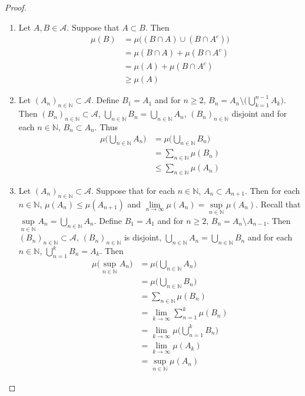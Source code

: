 \documentclass[12pt]{amsart}
\newcommand{\N}{\mathbb{N}}
\newcommand{\MA}{\mathcal{A}}
\begin{document}
\begin{proof}\
\begin{enumerate}
\item Let $A, B \in \MA$. Suppose that $A \subset B$. Then 
\begin{align*}
\mu(B) 
&= \mu\bigg((B \cap A) \cup (B \cap A^c)\bigg)\\
&= \mu(B \cap A) + \mu(B \cap A^c)\\
&= \mu(A) + \mu(B \cap A^c)\\
&\geq \mu(A)
\end{align*}
\item Let $(A_n)_{n \in \N} \subset \MA$. Define $B_1 = A_1$ and for $n \geq 2$, $B_n = A_n \setminus \bigg( \bigcup\limits_{k=1}^{n-1}A_k \bigg)$. Then $(B_n)_{n \in \N} \subset \MA$, $\bigcup\limits_{n \in \N}B_n = \bigcup\limits_{n \in \N}A_n $, $(B_n)_{n \in \N}$ disjoint and for each $n \in \N$, $B_n \subset A_n$. Thus 
\begin{align*}
\mu\bigg(\bigcup_{n \in \N}A_n \bigg)
&= \mu\bigg(\bigcup_{n \in \N}B_n \bigg)\\
&= \sum_{n \in \N}\mu(B_n) \\
&\leq \sum_{n \in \N}\mu(A_n)
\end{align*} 
\item Let $(A_n)_{n \in \N} \subset \MA$. Suppose that for each $n \in \N$, $A_n \subset A_{n+1}$. Then for each $n \in \N$, $\mu(A_n) \leq \mu(A_{n+1})$ and $\lim\limits_{n \rightarrow \infty}\mu(A_n) = \sup\limits_{n \in \N} \mu(A_n)$. Recall that $\sup\limits_{n \in \N}A_n = \bigcup\limits_{n \in \N}A_n$. 
Define $B_1 = A_1$ and for $n \geq 2$, $B_n = A_n \setminus A_{n-1}$. Then $(B_n)_{n \in \N} \subset \MA$, $(B_n)_{n \in \N}$ is disjoint, $\bigcup\limits_{n \in \N}A_n = \bigcup\limits_{n \in \N}B_n$ and for each $n \in \N$, $\bigcup\limits_{n=1}^{k}B_n = A_k$. Then 
\begin{align*}
\mu\bigg(\sup_{n \in \N}A_n \bigg)
&= \mu\bigg(\bigcup_{n \in \N}A_n \bigg) \\
&= \mu\bigg(\bigcup\limits_{n \in \N}B_n \bigg)\\
&= \sum_{n \in \N} \mu(B_n) \\
&= \lim_{k \rightarrow \infty} \sum_{n=1}^k \mu(B_n) \\
&= \lim_{k \rightarrow \infty} \mu \bigg(\bigcup_{n=1}^k B_n \bigg) \\
&= \lim_{k \rightarrow \infty} \mu(A_k) \\
&= \sup_{n \in \N} \mu(A_n)
\end{align*}

\end{enumerate}
\end{proof}
\end{document}
